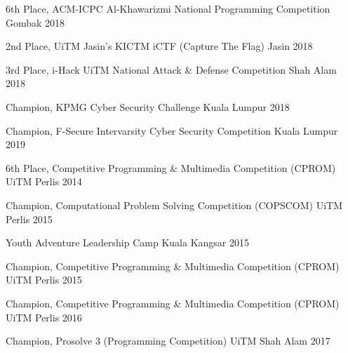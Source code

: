 \begin{cvhonors}
  \cvhonor
    {6th Place,}
    {ACM-ICPC Al-Khawarizmi National Programming Competition}
    {Gombak}
    {2018}

  \cvhonor
    {2nd Place,}
    {UiTM Jasin's KICTM iCTF (Capture The Flag) }
    {Jasin}
    {2018}

  \cvhonor
    {3rd Place,}
    {i-Hack UiTM National Attack \& Defense Competition}
    {Shah Alam}
    {2018}

  \cvhonor
    {Champion,}
    {KPMG Cyber Security Challenge}
    {Kuala Lumpur}
    {2018}

  \cvhonor
  {Champion,}
  {F-Secure Intervarsity Cyber Security Competition}
  {Kuala Lumpur}
  {2019}

\end{cvhonors}


\begin{cvhonors}

  \cvhonor
    {6th Place,}
    {Competitive Programming \& Multimedia Competition (CPROM)}
    {UiTM Perlis}
    {2014}

  \cvhonor
    {Champion,}
    {Computational Problem Solving Competition (COPSCOM)}
    {UiTM Perlis}
    {2015}

  \cvhonor
    {}
    {Youth Adventure Leadership Camp}
    {Kuala Kangsar}
    {2015}

  \cvhonor
    {Champion,}
    {Competitive Programming \& Multimedia Competition (CPROM)}
    {UiTM Perlis}
    {2015}
        
  \cvhonor
    {Champion,}
    {Competitive Programming \& Multimedia Competition (CPROM)}
    {UiTM Perlis}
    {2016}

  \cvhonor
    {Champion,}
    {Prosolve 3 (Programming Competition)}
    {UiTM Shah Alam}
    {2017}

\end{cvhonors}
